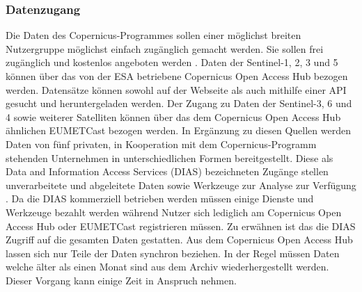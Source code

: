 \subsubsection{Datenzugang}
Die Daten des Copernicus-Programmes sollen einer möglichst breiten Nutzergruppe möglichst einfach zugänglich gemacht werden. Sie sollen frei zugänglich und kostenlos angeboten 
werden \cite{copernicus_regulation}. Daten der Sentinel-1, 2, 3 und 5 können über das von der ESA betriebene Copernicus Open Access Hub bezogen werden. Datensätze können sowohl
auf der Webseite als auch mithilfe einer API gesucht und heruntergeladen werden. Der Zugang zu Daten der Sentinel-3, 6 und 4 sowie weiterer Satelliten können über das 
dem Copernicus Open Access Hub ähnlichen EUMETCast bezogen werden.
In Ergänzung zu diesen Quellen werden Daten von fünf privaten, in Kooperation mit dem Copernicus-Programm stehenden Unternehmen in unterschiedlichen Formen bereitgestellt. 
Diese als Data and Information Access Services (DIAS) bezeichneten Zugänge stellen unverarbeitete und abgeleitete Daten sowie Werkzeuge zur Analyse zur Verfügung \cite{dias_factsheet}.
Da die DIAS kommerziell betrieben werden müssen einige Dienste und Werkzeuge bezahlt werden während Nutzer sich lediglich am Copernicus Open Access Hub oder EUMETCast 
registrieren müssen. Zu erwähnen ist das die DIAS Zugriff auf die gesamten Daten gestatten. Aus dem Copernicus Open Access Hub lassen sich nur Teile der Daten synchron beziehen.
In der Regel müssen Daten welche älter als einen Monat sind aus dem Archiv wiederhergestellt werden. Dieser Vorgang kann einige Zeit in Anspruch nehmen. 

